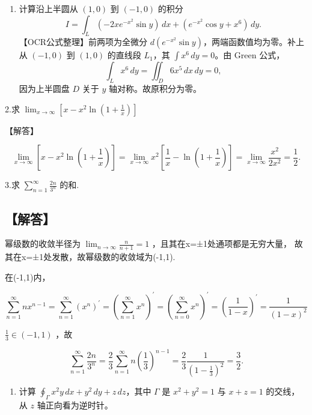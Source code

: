 \documentclass[11pt,fontset=fandol]{ctexart}
\providecommand{\tightlist}{\setlength{\itemsep}{0pt}\setlength{\parskip}{0pt}}
\begin{document}
\begin{enumerate}
\def\labelenumi{\arabic{enumi}.}
\tightlist
\item
  计算沿上半圆从 \((1,0)\) 到 \((-1,0)\) 的积分 \[
  I=\int_L(-2xe^{-x^2}\sin y)\,dx+(e^{-x^2}\cos y+x^6)\,dy.
  \] 【OCR公式整理】前两项为全微分
  \(d(e^{-x^2}\sin y)\)，两端函数值均为零。补上从 \((-1,0)\) 到
  \((1,0)\) 的直线段 \(L_1\)，其 \(\int x^6\,dy=0\)。由 Green 公式， \[
  \int_Lx^6\,dy=\iint_D6x^5\,dx\,dy=0,
  \] 因为上半圆盘 \(D\) 关于 \(y\) 轴对称。故原积分为零。
\end{enumerate}

2.求
\(\lim _ { x \to \infty } \left[ x - x ^ { 2 } \ln \left( 1 + { \frac { 1 } { x } } \right) \right]\)

【解答】

\[
\lim _ { x \to \infty } \left[ x - x ^ { 2 } \ln \left( 1 + { \frac { 1 } { x } } \right) \right] = \lim _ { x \to \infty } x ^ { 2 } \left[ { \frac { 1 } { x } } - \ln \left( 1 + { \frac { 1 } { x } } \right) \right] = \lim _ { x \to \infty } { \frac { x ^ { 2 } } { 2 x ^ { 2 } } } = { \frac { 1 } { 2 } } .
\]

3.求 \(\sum _ { n = 1 } ^ { \infty } { \frac { 2 n } { 3 ^ { n } } }\)
的和.

\subsection{【解答】}\label{ux89e3ux7b54-3}

幂级数的收敛半径为
\(\lim _ { n \to \infty } { \frac { n } { n + 1 } } = 1\)
，且其在x=±1处通项都是无穷大量，
故其在x=±1处发散，故幂级数的收敛域为(-1,1).

在(-1,1)内，

\[
\sum _ { n = 1 } ^ { \infty } n x ^ { n - 1 } = \sum _ { n = 1 } ^ { \infty } ( x ^ { n } ) ^ { \prime } = ( \sum _ { n = 1 } ^ { \infty } x ^ { n } ) ^ { \prime } = ( \sum _ { n = 0 } ^ { \infty } x ^ { n } ) ^ { \prime } = ( { \frac { 1 } { 1 - x } } ) ^ { \prime } = { \frac { 1 } { ( 1 - x ) ^ { 2 } } }
\]

\(\frac { 1 } { 3 } \in ( - 1 , 1 )\) ，故

\[
\sum _ { n = 1 } ^ { \infty } \frac { 2 n } { 3 ^ { n } } = \frac { 2 } { 3 } \sum _ { n = 1 } ^ { \infty } n ( \frac { 1 } { 3 } ) ^ { n - 1 } = \frac { 2 } { 3 } \frac { 1 } { ( 1 - \frac { 1 } { 3 } ) ^ { 2 } } = \frac { 3 } { 2 } .
\]

\begin{enumerate}
\def\labelenumi{\arabic{enumi}.}
\setcounter{enumi}{3}
\tightlist
\item
  计算 \(\oint_\Gamma x^2y\,dx+y^2\,dy+z\,dz\)，其中 \(\Gamma\) 是
  \(x^2+y^2=1\) 与 \(x+z=1\) 的交线，从 \(z\) 轴正向看为逆时针。
\end{enumerate}
\end{document}
